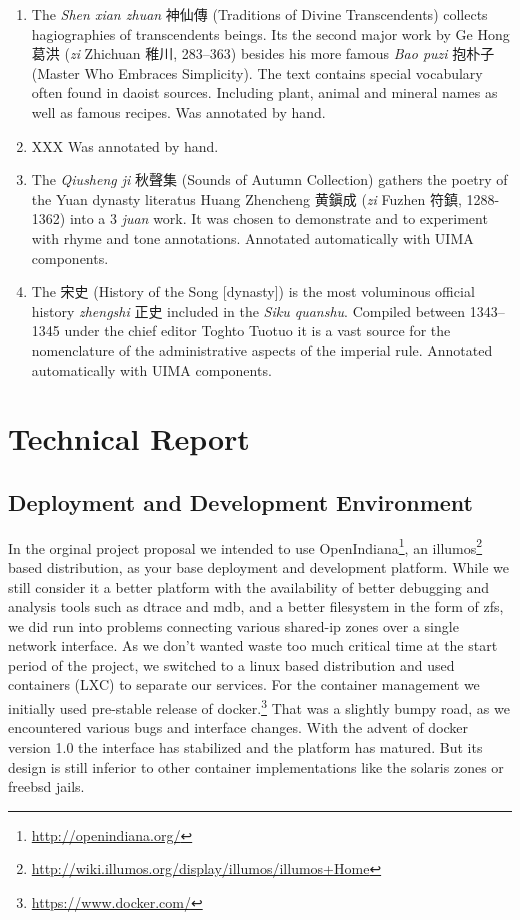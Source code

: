 \documentclass[12pt, draft]{article}
\begin{document}
\begin{enumerate}
\item The \emph{Shen xian zhuan} 神仙傳 (Traditions of Divine Transcendents)
collects hagiographies of transcendents beings.  Its the second major
work by Ge Hong 葛洪 (\emph{zi} Zhichuan 稚川, 283--363) besides his more
famous \emph{Bao puzi} 抱朴子 (Master Who Embraces Simplicity).
The text contains special vocabulary often found in daoist sources.
Including plant, animal and mineral names as well as famous recipes.
Was annotated by hand.

\item XXX
Was annotated by hand.

\item The \emph{Qiusheng ji} 秋聲集 (Sounds of Autumn Collection) gathers the poetry
of the Yuan dynasty literatus Huang Zhencheng 黄鎭成 (\emph{zi} Fuzhen 符鎮, 1288-1362)
into a 3 \emph{juan} work.
It was chosen to demonstrate  and to experiment with rhyme and tone annotations.
Annotated automatically with UIMA components.

\item The 宋史 (History of the Song [dynasty]) is the most voluminous
 official history \emph{zhengshi} 正史 included in the \emph{Siku quanshu}.
Compiled between 1343--1345 under the chief editor Toghto Tuotuo 
it is a vast source for the nomenclature  of the administrative aspects
of the imperial rule.
Annotated automatically with UIMA components.

\end{enumerate}
 
\section{Technical Report}

\subsection{Deployment and Development Environment}

In the orginal project proposal we intended to use OpenIndiana\footnote{\url{http://openindiana.org/}},
an illumos\footnote{\url{http://wiki.illumos.org/display/illumos/illumos+Home}}
 based distribution, as your base deployment and development
platform.
While we still consider it a better platform with
the availability of better debugging and analysis tools
such as dtrace and mdb, and a better filesystem in the form of zfs,
we did run into problems connecting various shared-ip zones over a single network interface.
As we don't wanted waste too much critical time at the
start period of the project, we switched to a linux based
distribution and used containers (LXC) to separate our
services.  For the container management we initially
used pre-stable release of docker.\footnote{\url{https://www.docker.com/}}
That was a slightly
bumpy road, as we encountered various bugs and interface changes.
With the advent of docker version 1.0 the interface has
stabilized and the platform has matured.
But its design is still inferior to other
container implementations like the solaris zones or freebsd jails.
\end{document}
